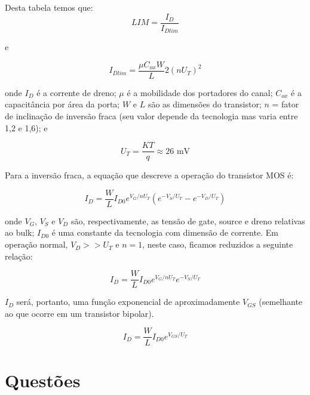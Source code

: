 \documentclass[12pt,a4paper]{article}
\begin{document}
Desta tabela temos que:
\begin{equation}
LIM = \frac{I_D}{I_{Dlim}}
\end{equation}

e

\begin{equation}
I_{Dlim} = \frac{\mu C_{ox} W}{L} 2 \left(nU_T\right)^2
\end{equation}

onde $I_D$ é a corrente de dreno; $\mu$ é a mobilidade dos portadores do canal; $C_{ox}$ é a capacitância por área da porta; $W$ e $L$ são as dimensões do transistor; $n$ = fator de inclinação de inversão fraca (seu valor depende da tecnologia mas varia entre 1,2 e 1,6); e

\begin{equation}
U_T = \frac{KT}{q} \approx 26 \text{ mV}
\end{equation}

Para a inversão fraca, a equação que descreve a operação do transistor MOS é:

\begin{equation}
I_D = \frac{W}{L} I_{D0} e^{V_G/nU_T} \left( e^{-V_S/U_T} - e^{-V_D/U_T} \right)
\end{equation}

onde $V_G$, $V_S$ e $V_D$ são, respectivamente, as tensão de gate, source e dreno relativas ao bulk; $I_{D0}$ é uma constante da tecnologia com dimensão de corrente. Em operação normal, $V_D >> U_T$ e $n = 1$, neste caso, ficamos reduzidos a seguinte relação:

\begin{equation}
I_D = \frac{W}{L} I_{D0} e^{V_G/nU_T} e^{-V_S/U_T}
\end{equation}

$I_D$ será, portanto, uma função exponencial de aproximadamente $V_{GS}$ (semelhante ao que ocorre em um transistor bipolar).

\begin{equation}
I_D = \frac{W}{L} I_{D0} e^{V_{GS}/U_T}
\end{equation}

\newpage

\section*{Questões}
\end{document}
